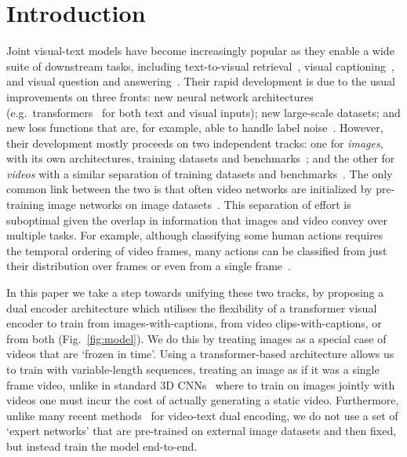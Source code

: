 \documentclass[10pt,twocolumn,letterpaper]{article}
\begin{document}
\section{Introduction}
Joint visual-text models have become increasingly popular as they enable a 
wide suite of downstream tasks, including text-to-visual retrieval~\cite{lin2014microsoft,wang2016learning,miech18learning,Liu19a},
visual captioning~\cite{vinyals2016show,you2016image,krishna2017dense}, and visual question and answering~\cite{antol2015vqa,lei2018tvqa}. Their rapid development is due to the usual improvements on
three fronts: new neural network architectures (e.g.\ transformers~\cite{vaswani2017attention} for both text and visual inputs); new large-scale
datasets; and new loss functions that are, for example, able to handle label noise~\cite{miech20endtoend}.
However, their development mostly proceeds on two independent tracks: one for {\em images}, with its own architectures,
training datasets and benchmarks~\cite{lin2014microsoft,krishna2017visual,sharma2018conceptual}; and the other for {\em videos} with a similar separation of training datasets and benchmarks~\cite{xu2016msr,anne2017localizing,krishna2017dense,rohrbach2017movie,zhou2018towards,bain2020condensed}. The only common link between the two is that often video networks are initialized by pre-training image networks
on image datasets~\cite{Carreira2017,bertasius2021spacetime}.
This separation of effort is suboptimal given the overlap in information that images and video convey over multiple tasks.
For example, although classifying some human actions requires the temporal ordering of video frames, many actions
can be classified from just their distribution over frames or even from a single frame~\cite{sevilla2021only}.

In this paper we take a step towards unifying these two tracks, by  proposing  a dual encoder architecture which utilises the flexibility of a transformer
visual encoder to train from images-with-captions, from video clips-with-captions, or from both (Fig.~\ref{fig:model}). 
We do this by treating images as a special case of videos that are `frozen
in time'. Using a transformer-based architecture allows us to train
with variable-length sequences, treating
an image as if it was a single frame video, unlike in standard 3D CNNs~\cite{Carreira2017,HaraCVPR2018,xie2018rethinking} where to train on images jointly with videos one must incur the cost
of actually generating a static video.
Furthermore, unlike many recent
methods~\cite{miech18learning,Liu19a, gabeur2020multi} for video-text dual encoding, we do not use a set of `expert networks' that are pre-trained on external image
datasets and then fixed, but instead train the model end-to-end.
\end{document}
